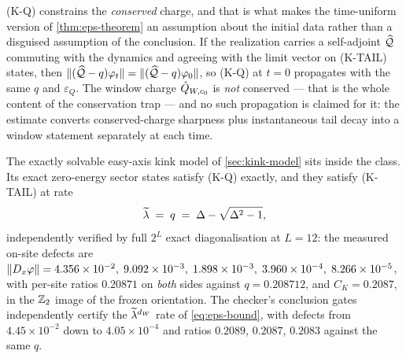 \begin{remark}
\label{rem:kq-propagation}
(K-Q) constrains the \emph{conserved} charge, and that is what makes the
time-uniform version of \cref{thm:eps-theorem} an assumption about the initial
data rather than a disguised assumption of the conclusion. If the realization
carries a self-adjoint $\widehat{\mathcal{Q}}$ commuting with the dynamics and
agreeing with the limit vector on (K-TAIL) states, then
$\lVert (\widehat{\mathcal{Q}}-q)\varphi_t\rVert=\lVert (\widehat{\mathcal{Q}}-q)\varphi_0\rVert$, so
(K-Q) at $t=0$ propagates with the same $q$ and $\varepsilon_Q$. The window
charge $\hat{Q}_{W,c_0}$ is \emph{not} conserved --- that is the whole content of
the conservation trap --- and no such propagation is claimed for it: the
estimate converts conserved-charge sharpness plus instantaneous tail decay into
a window statement separately at each time.
\end{remark}

\begin{remark}
\label{rem:d16-instantiation}
The exactly solvable easy-axis kink model of \cref{sec:kink-model} sits inside
the class. Its exact zero-energy sector states satisfy (K-Q) exactly, and they
satisfy (K-TAIL) at rate
\begin{equation}
  \widetilde{\lambda} \;=\; q \;=\; \Delta-\sqrt{\Delta^2-1},
  \label{eq:d16-rate}
\end{equation}
independently verified by full $2^L$ exact diagonalisation at $L=12$: the
measured on-site defects are
$\lVert D_x\varphi\rVert=4.356\times10^{-2},\;9.092\times10^{-3},\;
1.898\times10^{-3},\;3.960\times10^{-4},\;8.266\times10^{-5}$, with per-site
ratios $0.20871$ on \emph{both} sides against $q=0.208712$, and $C_K=0.2087$,
in the $\mathbb{Z}_2$ image of the frozen orientation. The checker's conclusion gates
independently certify the $\widetilde{\lambda}^{d_W}$ rate of \eqref{eq:eps-bound}, with
defects from $4.45\times10^{-2}$ down to $4.05\times10^{-4}$ and ratios
$0.2089$, $0.2087$, $0.2083$ against the same $q$.
\end{remark}



